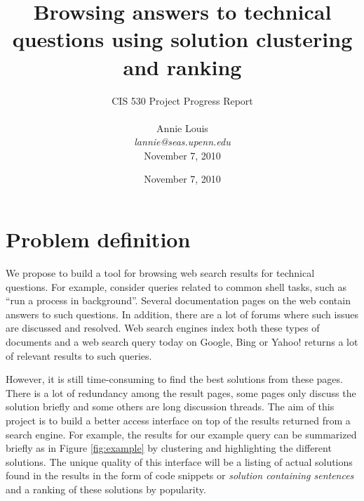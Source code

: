 \documentclass[11pt]{article}
\title{Browsing answers to technical questions using solution clustering and ranking}
\author{CIS 530 Project Progress Report\\
\\
Annie Louis\\
\textit{lannie@seas.upenn.edu}\\
November 7, 2010}
\date{November 7, 2010}
\begin{document}
\maketitle





\section{Problem definition}

We propose to build a tool for browsing web search results for technical questions.
For example, consider queries related to common shell tasks, such as 
``run a process in background''. 
Several documentation pages on the web contain answers to such questions. In addition, 
there are a lot of forums where such issues are discussed and resolved. Web 
search engines index both these types of
documents and a web search query today on Google, Bing or Yahoo! returns a lot of relevant 
results to such queries. 

However, it is still time-consuming to find the best solutions from these pages. There is a lot 
of redundancy among the result pages, some pages only discuss the solution briefly and
some others are long discussion threads.
 The aim of this project is to build a better access interface on
top of the results returned from a search engine. For example, the 
results for our example query can be summarized briefly 
as in Figure \ref{fig:example} by clustering and highlighting the different 
solutions. 
The unique quality of this interface 
will be a listing of actual solutions found in the results
 in the form of code snippets or \emph{solution
containing sentences} and a ranking of these solutions by popularity. 
\end{document}
